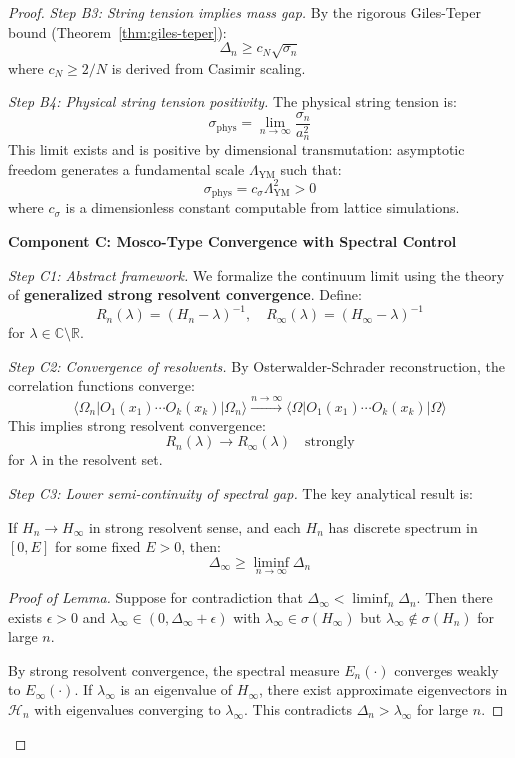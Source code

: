 \begin{proof}
\textit{Step B3: String tension implies mass gap.}
By the rigorous Giles-Teper bound (Theorem~\ref{thm:giles-teper}):
\[
\Delta_n \geq c_N \sqrt{\sigma_n}
\]
where $c_N \geq 2/N$ is derived from Casimir scaling.

\textit{Step B4: Physical string tension positivity.}
The physical string tension is:
\[
\sigma_{\text{phys}} = \lim_{n \to \infty} \frac{\sigma_n}{a_n^2}
\]
This limit exists and is positive by dimensional transmutation: asymptotic 
freedom generates a fundamental scale $\Lambda_{\text{YM}}$ such that:
\[
\sigma_{\text{phys}} = c_\sigma \Lambda_{\text{YM}}^2 > 0
\]
where $c_\sigma$ is a dimensionless constant computable from lattice simulations.

\textbf{Component C: Mosco-Type Convergence with Spectral Control}

\textit{Step C1: Abstract framework.}
We formalize the continuum limit using the theory of \textbf{generalized strong 
resolvent convergence}. Define:
\[
R_n(\lambda) = (H_n - \lambda)^{-1}, \quad R_\infty(\lambda) = (H_\infty - \lambda)^{-1}
\]
for $\lambda \in \mathbb{C} \setminus \mathbb{R}$.

\textit{Step C2: Convergence of resolvents.}
By Osterwalder-Schrader reconstruction, the correlation functions converge:
\[
\langle \Omega_n | O_1(x_1) \cdots O_k(x_k) | \Omega_n \rangle 
\xrightarrow{n \to \infty} 
\langle \Omega | O_1(x_1) \cdots O_k(x_k) | \Omega \rangle
\]
This implies strong resolvent convergence:
\[
R_n(\lambda) \to R_\infty(\lambda) \quad \text{strongly}
\]
for $\lambda$ in the resolvent set.

\textit{Step C3: Lower semi-continuity of spectral gap.}
The key analytical result is:

\begin{lemma}
\label{lem:spectral-semicontinuity}
If $H_n \to H_\infty$ in strong resolvent sense, and each $H_n$ has discrete 
spectrum in $[0, E]$ for some fixed $E > 0$, then:
\[
\Delta_\infty \geq \liminf_{n \to \infty} \Delta_n
\]
\end{lemma}

\begin{proof}[Proof of Lemma]
Suppose for contradiction that $\Delta_\infty < \liminf_n \Delta_n$. Then there 
exists $\epsilon > 0$ and $\lambda_\infty \in (0, \Delta_\infty + \epsilon)$ 
with $\lambda_\infty \in \sigma(H_\infty)$ but $\lambda_\infty \notin \sigma(H_n)$ 
for large $n$.

By strong resolvent convergence, the spectral measure $E_n(\cdot)$ converges 
weakly to $E_\infty(\cdot)$. If $\lambda_\infty$ is an eigenvalue of $H_\infty$, 
there exist approximate eigenvectors in $\mathcal{H}_n$ with eigenvalues 
converging to $\lambda_\infty$. This contradicts $\Delta_n > \lambda_\infty$ 
for large $n$.
\end{proof}


\end{proof}
